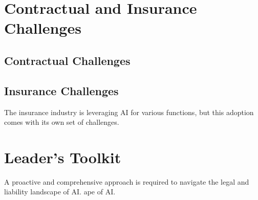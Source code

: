 \section{Contractual and Insurance Challenges}
\label{sec:contractual_challenges}

\subsection{Contractual Challenges}

\subsection{Insurance Challenges}

The insurance industry is leveraging AI for various functions, but this adoption comes with its own set of challenges. 


\section{Leader's Toolkit}
\label{sec:legal_leaders_toolkit}

A proactive and comprehensive approach is required to navigate the legal and liability landscape of AI.
ape of AI.
